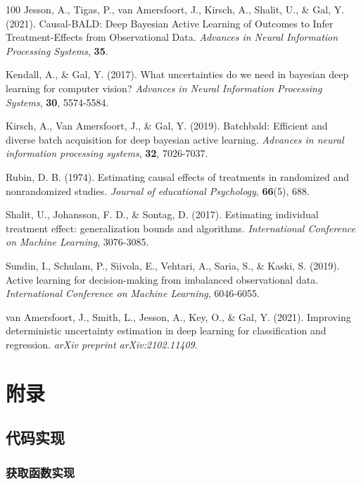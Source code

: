 \documentclass[12pt]{article}
\begin{document}
\begin{thebibliography}{100}
Jesson, A., Tigas, P., van Amersfoort, J., Kirsch, A., Shalit, U., \& Gal, Y. (2021). Causal-BALD: Deep Bayesian Active Learning of Outcomes to Infer Treatment-Effects from Observational Data. \textit{Advances in Neural Information Processing Systems}, \textbf{35}.

Kendall, A., \& Gal, Y. (2017). What uncertainties do we need in bayesian deep learning for computer vision? \textit{Advances in Neural Information Processing Systems}, \textbf{30}, 5574-5584.

Kirsch, A., Van Amersfoort, J., \& Gal, Y. (2019). Batchbald: Efficient and diverse batch acquisition for deep bayesian active learning. \textit{Advances in neural information processing systems}, \textbf{32}, 7026-7037.

Rubin, D. B. (1974). Estimating causal effects of treatments in randomized and nonrandomized studies. \textit{Journal of educational Psychology}, \textbf{66}(5), 688.

Shalit, U., Johansson, F. D., \& Sontag, D. (2017). Estimating individual treatment effect: generalization bounds and algorithms. \textit{International Conference on Machine Learning}, 3076-3085.

Sundin, I., Schulam, P., Siivola, E., Vehtari, A., Saria, S., \& Kaski, S. (2019). Active learning for decision-making from imbalanced observational data. \textit{International Conference on Machine Learning}, 6046-6055.

van Amersfoort, J., Smith, L., Jesson, A., Key, O., \& Gal, Y. (2021). Improving deterministic uncertainty estimation in deep learning for classification and regression. \textit{arXiv preprint arXiv:2102.11409}.

\end{thebibliography}

\appendix

\section{附录}

\subsection{代码实现}

\subsubsection{获取函数实现}
\end{document}
